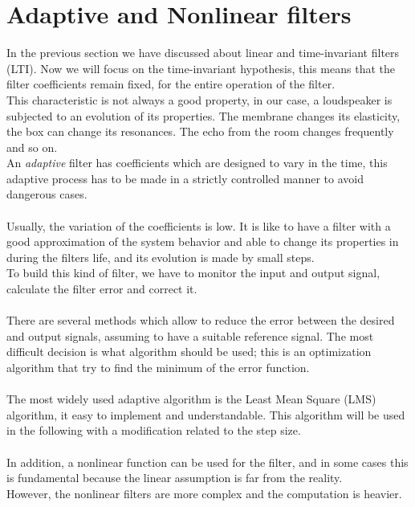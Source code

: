 \section{Adaptive and Nonlinear filters}
In the previous section we have discussed about linear and time-invariant filters (LTI). Now we will focus on the time-invariant hypothesis, this means that the filter coefficients remain fixed, for the entire operation of the filter.\\
This characteristic is not always a good property, in our case, a loudspeaker is subjected to an evolution of its properties. The membrane changes its elasticity, the box can change its resonances. The echo from the room changes frequently and so on.\\
An \textit{adaptive} filter has coefficients which are designed to vary in the time, this adaptive process has to be made in a strictly controlled manner to avoid dangerous cases.\\\\
Usually, the variation of the coefficients is low. It is like to have a filter with a good approximation of the system behavior and able to change its properties in during the filters life, and its evolution is made by small steps.\\
To build this kind of filter, we have to monitor the input and output signal, calculate the filter error and correct it.\\\\
There are several methods which allow to reduce the error between the desired and output signals, assuming to have a suitable reference signal. The most difficult decision is what algorithm should be used; this is an optimization algorithm that try to find the minimum of the error function.\\\\
The most widely used adaptive algorithm is the Least Mean Square (LMS) algorithm, it easy to implement and understandable. This algorithm will be used in the following with a modification related to the step size.\\\\
In addition, a nonlinear function can be used for the filter, and in some cases this is fundamental because the linear assumption is far from the reality.\\
However, the nonlinear filters are more complex and the computation is heavier.
